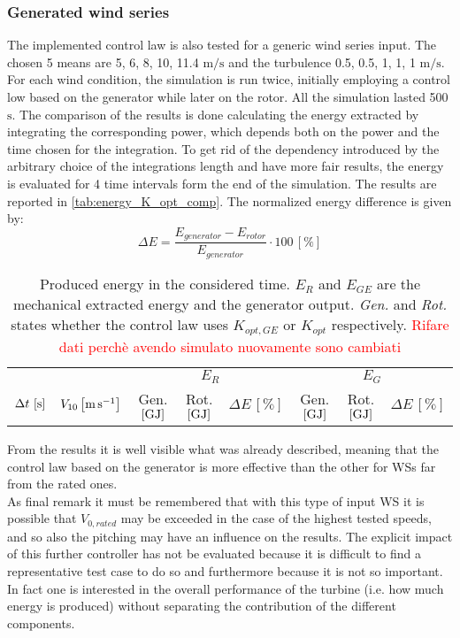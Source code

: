\subsubsection{Generated wind series}
The implemented control law is also tested for a generic wind series input. The chosen 5 means are 5, 6, 8, 10, 11.4 $\si{\meter\per\second}$ and the turbulence 0.5, 0.5, 1, 1, 1 $\si{\meter\per\second}$. For each wind condition, the simulation is run twice, initially employing a control low based on the generator while later on the rotor. All the simulation lasted 500 $\si{\second}$. The comparison of the results is done calculating the energy extracted by integrating the corresponding power, which depends both on the power and the time chosen for the integration. To get rid of the dependency introduced by the arbitrary choice of the integrations length and have more fair results, the energy is evaluated for 4 time intervals form the end of the simulation. The results are reported in \autoref{tab:energy_K_opt_comp}. The normalized energy difference is given by:
\begin{equation}
  \Delta E = \frac{E_{generator} - E_{rotor}}{E_{generator}}\cdot 100 \, \left[\%\right]
\end{equation}

\begin{table}[htb]
  \centering
  \caption{Produced energy in the considered time. $E_R$ and $E_{GE}$ are the mechanical extracted energy and the generator output. \textit{Gen.} and \textit{Rot.} states whether the control law uses $K_{opt,GE}$ or $K_{opt}$ respectively. \textcolor{Red}{Rifare dati perchè avendo simulato nuovamente sono cambiati}}
  \begin{tabular}{cc|ccc|ccc}
    \toprule
    & & \multicolumn{3}{c}{$E_R$} & \multicolumn{3}{|c}{$E_G$} \\
     $\Delta t \,\left[\si{\second}\right]$ &  $V_{10} \left[\si{\meter\per\second}\right]$ & Gen. $\left[\si{\giga\joule}\right]$ & Rot. $\left[\si{\giga\joule}\right]$ & $\Delta E \, \left[\%\right]$ & Gen. $\left[\si{\giga\joule}\right]$ & Rot. $\left[\si{\giga\joule}\right]$ & $\Delta E \, \left[\%\right]$ \\ \midrule
    
  \end{tabular}
  \label{tab:energy_K_opt_comp}
\end{table}

From the results it is well visible what was already described, meaning that the control law based on the generator is more effective than the other for WSs far from the rated ones. \\
As final remark it must be remembered that with this type of input WS it is possible that $V_{0,rated}$ may be exceeded in the case of the highest tested speeds, and so also the pitching may have an influence on the results. The explicit impact of this further controller has not be evaluated because it is difficult to find a representative test case to do so and furthermore because it is not so important. In fact one is interested in the overall performance of the turbine (i.e. how much energy is produced) without separating the contribution of the different components. 

